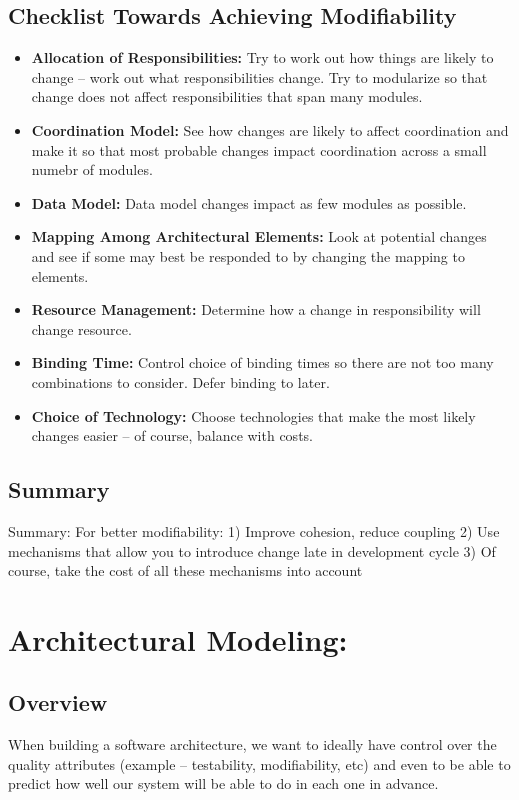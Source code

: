 \documentclass[a4paper]{report}
\begin{document}
\section{Checklist Towards Achieving Modifiability}
\begin{itemize}
\item
\textbf{Allocation of Responsibilities:}
Try to work out how things are likely to change – work out what responsibilities change.
Try to modularize so that change does not affect responsibilities that span many modules.

\item
\textbf{Coordination Model:}
See how changes are likely to affect coordination and make it so that most probable changes impact coordination across a small numebr of modules.  

\item
\textbf{Data Model:}
Data model changes impact as few modules as possible.

\item
\textbf{Mapping Among Architectural Elements:}
Look at potential changes and see if some may best be responded to by changing the mapping to elements.

\item
\textbf{Resource Management:}
Determine how a change in responsibility will change resource.

\item
\textbf{Binding Time:}
Control choice of binding times so there are not too many combinations to consider. Defer binding to later.

\item
\textbf{Choice of Technology:} 
Choose technologies that make the most likely changes easier – of course, balance with costs.
\end{itemize}

\section{Summary}
Summary:
For better modifiability:
1) Improve cohesion, reduce coupling
2) Use mechanisms that allow you to introduce change late in development cycle
3) Of course, take the cost of all these mechanisms into account

\chapter{Architectural Modeling:}
\section{Overview}
When building a software architecture, we want to ideally have control over the quality attributes (example – testability, modifiability, etc) and even to be able to predict how well our system will be able to do in each one in advance. 
\end{document}
